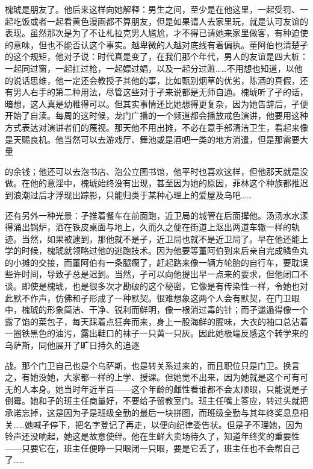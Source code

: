 \documentclass{article}
\begin{document}
槐琥是朋友了。他后来这样向她解释：男生之间，至少是在他这里，一起受罚、一起吃饭或者一起看黄色漫画都不算朋友，但是如果请人去家里玩，就是认可友谊的表现。虽然那次是为了不让札拉克男人尴尬，才不得已请她来家里做客，有种迫使的意味，但也不能否认这个事实。越卑微的人越对底线有着偏执。董阿伯也清楚孑的这个规矩，他对孑说：时代真是变了，在我们那个年代，男人的友谊是四大桩：一起同过窗，一起扛过枪，一起嫖过娼，以及一起分过赃……不用想也知道，以他的说话思维，他一定还会教授孑其他的事，比如甄别烟草的优劣，陈酒的真假，还有男人右手的第二种用法，尽管这些对于孑来说都是无师自通。槐琥听了孑的话，暗想，这人真是幼稚得可以。但其实事情还比她想得更复杂，因为她告辞后，孑便开始了自渎。每周的这时候，龙门广播的一个频道都会播放戒色演讲，他要用这种方式表达对演讲者们的蔑视。那天他不用出摊，不必在意手部清洁卫生，看起来像是天赐良机。他当然可以去游戏厅、舞池或是酒吧一类的地方消遣，但是那需要大量

\newpage 

的余钱；他还可以去泡书店、泡公立图书馆，他平时也喜欢这样，但他那天就是没做。在他的意淫中，槐琥始终没有出现，甚至因为她的原因，菲林这个种族都推迟到浪潮过后才浮现出踪影，只能归类于某种心理上的爱屋及乌吧……

还有另外一种光景：孑推着餐车在前面跑，近卫局的城管在后面撵他。汤汤水水漾得涌出锅炉，洒在铁皮桌面与地上，久而久之便在街道上沤出两道车辙一样的轨迹。当然，如果被逮到，那他就不是孑，近卫局也就不是近卫局了。早在他还能上学的时候，槐琥就领略过他的逃跑技术。因为他要等董阿伯到来后亲自完成鳞鱼丸的小摊的交接，而董阿伯有一条腿瘸了，赶起路来像一辆方轮胎的自行车，要耽误些许时间，导致孑总是迟到。当然，孑可以向他提出早一点来的要求，但他闭口不谈。即使是槐琥，也是很多次才勘破的这个秘密，它像是有传染性一样，令她也对此默不作声，仿佛和孑形成了一种默契。很难想象这两个人会有默契，在门卫眼中，槐琥的形象简洁、干净、锐利而鲜明，像一根消过毒的针；而孑邋遢得像一个露了馅的菜包子，每天踩着点狂奔而来，身上一股海鲜的腥味，大衣的袖口总沾着一圈铁黑色的油污，露出鞋口的袜子一只黄一只灰。因此她极端反感这个转学来的乌萨斯，同他展开了旷日持久的追逐

\newpage 

战。那个门卫自己也是个乌萨斯，也是转关系过来的，而且职位只是门卫。换言之，有她没她，大家都一样的上学、授课。但她觉不出来，因为她就是这个可有可无的人本身。她当时年近半百——这个年龄的雌性看谁都不会太顺眼，只能说是孑倒霉。她和孑的班主任商量好，不要给孑留教室门。班主任嘴上答应，转过头就把承诺忘掉，这是因为孑是班级全勤的最后一块拼图，而班级全勤与其年终奖息息相关……她喊孑停下，把名字登记了再走，以便向纪律委告状。但是孑不理她，因为铃声还没响起，她这是故意使绊。他在生鲜大卖场待久了，知道年终奖的重要性——只要它在，班主任便睁一只眼闭一只眼，要是它丢了，班主任也不会帮自己了……
\end{document}
